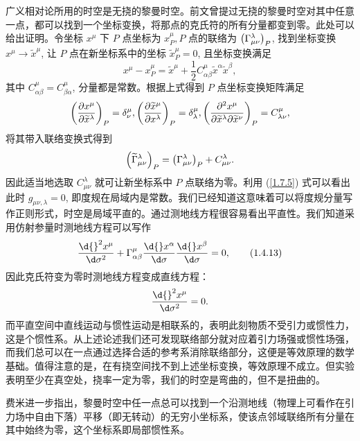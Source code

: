 \documentclass[UTF8, 12pt, a4paper, oneside, onecolumn, fontset=none]{ctexart}
\begin{document}
广义相对论所用的时空是无挠的黎曼时空。前文曾提过无挠的黎曼时空对其中任意一点，都可以找到一个坐标变换，将那点的克氏符的所有分量都变到零。此处可以给出证明。令坐标 $x^{\mu}$ 下 $P$ 点坐标为 $x^{\mu}_{P}, P$ 点的联络为 $\mleft(\Gamma^{\lambda}_{\mu\nu}\mright)_{P}$, 找到坐标变换 $x^{\mu}\to\widetilde{x}^{\mu}$, 让 $P$ 点在新坐标系中的坐标 $\widetilde{x}^{\mu}_{P}=0$, 且坐标变换满足
\begin{equation}
x^{\mu}-x^{\mu}_{P}=\widetilde{x}^{\mu}+\frac{1}{2}C_{\alpha\beta}^{\mu}\widetilde{x}^{\alpha}\widetilde{x}^{\beta},
\end{equation}
其中 $C_{\alpha\beta}^{\mu}=C_{\beta\alpha}^{\mu}$, 分量都是常数。根据上式得到 $P$ 点坐标变换矩阵满足
\begin{equation}
\mleft(\frac{\partial{}x^{\mu}}{\partial\widetilde{x}^{\lambda}}\mright)_{P}=\delta^{\mu}_{\nu},\mleft(\frac{\partial\widetilde{x}^{\mu}}{\partial{}x^{\lambda}}\mright)_{P}=\delta^{\mu}_{\lambda},\mleft(\frac{\partial{}^{2}x^{\mu}}{\partial\widetilde{x}^{\lambda}\partial\widetilde{x}^{\nu}}\mright)_{P}=C_{\lambda\nu}^{\mu},
\end{equation}
将其带入联络变换式得到
\begin{equation}
\mleft(\widetilde{\Gamma}^{\lambda}_{\mu\nu}\mright)_{P}=\mleft(\Gamma^{\lambda}_{\mu\nu}\mright)_{P}+C_{\mu\nu}^{\lambda}.
\end{equation}
因此适当地选取 $C_{\mu\nu}^{\lambda}$ 就可让新坐标系中 $P$ 点联络为零。利用 (\ref{1.7.5}) 式可以看出此时 $g_{\mu\nu,\lambda}=0$, 即度规在局域内是常数。我们已经知道这意味着可以将度规分量写作正则形式，时空是局域平直的。通过测地线方程很容易看出平直性。我们知道采用仿射参量时测地线方程可以写作
\begin{equation}
\frac{\d{}^{2}x^{\mu}}{\d\sigma^{2}}+\Gamma_{\alpha\beta}^{\mu}\frac{\d{}x^{\alpha}}{\d\sigma}\frac{\d{}x^{\beta}}{\d\sigma}=0,\tag{1.4.13}
\end{equation}
因此克氏符变为零时测地线方程变成直线方程：
\begin{equation}
\frac{\d{}^{2}x^{\mu}}{\d\sigma^{2}}=0.
\end{equation}
而平直空间中直线运动与惯性运动是相联系的，表明此刻物质不受引力或惯性力，这是个惯性系。从上述论述我们还可发现联络部分就对应着引力场强或惯性场强，而我们总可以在一点通过选择合适的参考系消除联络部分，这便是等效原理的数学基础。值得注意的是，在有挠空间找不到上述坐标变换，等效原理不成立。但实验表明至少在真空处，挠率一定为零，我们的时空是弯曲的，但不是扭曲的。

费米进一步指出，黎曼时空中任一点总可以找到一个沿测地线（物理上可看作在引力场中自由下落）平移（即无转动）的无穷小坐标系，使该点邻域联络所有分量在其中始终为零，这个坐标系即局部惯性系。
\end{document}
